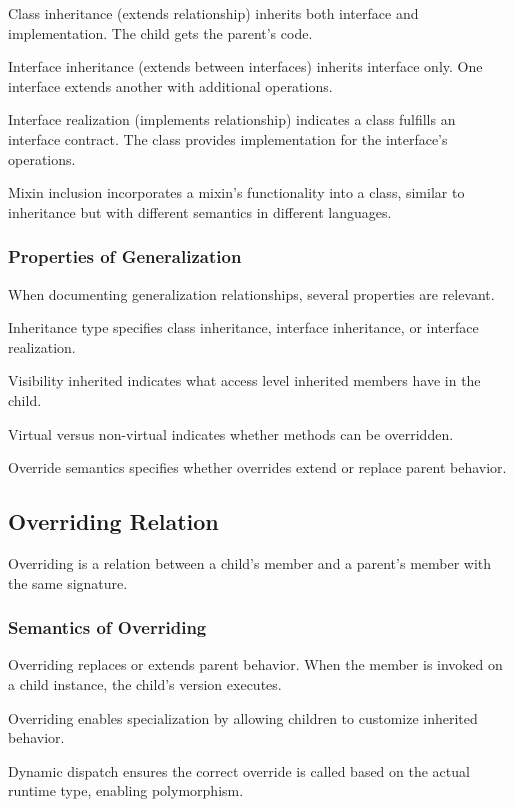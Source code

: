 \documentclass[11pt]{article}
\begin{document}
Class inheritance (extends relationship) inherits both interface and implementation. The child gets the parent's code.

Interface inheritance (extends between interfaces) inherits interface only. One interface extends another with additional operations.

Interface realization (implements relationship) indicates a class fulfills an interface contract. The class provides implementation for the interface's operations.

Mixin inclusion incorporates a mixin's functionality into a class, similar to inheritance but with different semantics in different languages.

\subsubsection{Properties of Generalization}

When documenting generalization relationships, several properties are relevant.

Inheritance type specifies class inheritance, interface inheritance, or interface realization.

Visibility inherited indicates what access level inherited members have in the child.

Virtual versus non-virtual indicates whether methods can be overridden.

Override semantics specifies whether overrides extend or replace parent behavior.

\subsection{Overriding Relation}

Overriding is a relation between a child's member and a parent's member with the same signature.

\subsubsection{Semantics of Overriding}

Overriding replaces or extends parent behavior. When the member is invoked on a child instance, the child's version executes.

Overriding enables specialization by allowing children to customize inherited behavior.

Dynamic dispatch ensures the correct override is called based on the actual runtime type, enabling polymorphism.
\end{document}
